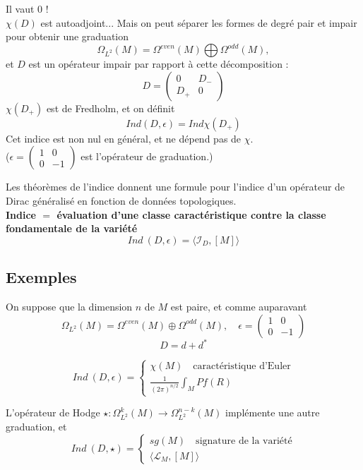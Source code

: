 \documentclass{beamer}
\begin{document}
\begin{frame}
Il vaut $0$ ! \\
$\chi(D)$ est autoadjoint... Mais on peut séparer les formes de degré pair et impair pour obtenir une graduation
\[\Omega_{L^2}(M) = \Omega^{even}(M) \bigoplus \Omega^{odd}(M),\]
et $D$ est un opérateur impair par rapport à cette décomposition :
\[D= \begin{pmatrix}0 & D_-\\ D_+ & 0  \end{pmatrix}\]
$\chi(D_+)$ est de Fredholm, et on définit
\[Ind(D,\epsilon)=Ind\chi(D_+)\]
Cet indice est non nul en général, et ne dépend pas de $\chi$.\\
($\epsilon = \begin{pmatrix}1 & 0 \\ 0 & -1\end{pmatrix}$ est l'opérateur de graduation.)
\end{frame}

\begin{frame}
Les théorèmes de l'indice donnent une formule pour l'indice d'un opérateur de Dirac généralisé en fonction de données topologiques.\\
\textbf{Indice $=$ évaluation d'une classe caractéristique contre la classe fondamentale de la variété }
\[Ind \ (D,\epsilon) = \langle \mathcal I _D , [M]\rangle\]
\end{frame}

\subsection{Exemples}
\begin{frame}%
On suppose que la dimension $n$ de $M$ est paire, et comme auparavant
\[\Omega_{L^2}(M)=\Omega^{even}(M)\oplus \Omega^{odd}(M),\quad \epsilon = \begin{pmatrix}1 & 0\\ 0 & -1 \end{pmatrix}\]
 \[D=d+d^*\]
\begin{thm}
\[Ind \ (D ,\epsilon) = \left\{\begin{array}{l} \chi(M)\quad \text{caractéristique d'Euler}\\ \frac{1}{(2\pi)^{n/2}}\int_M Pf(R)\end{array}\right.\]
\end{thm}
\end{frame}

\begin{frame}
L'opérateur de Hodge $\star : \Omega^{k}_{L^2}(M)\rightarrow \Omega_{L^2}^{n-k}(M)$ implémente une autre graduation, et 
\[Ind \ (D,\star) =\left\{ \begin{array}{l}sg(M)  \quad \text{signature de la variété}\\ \langle \mathcal L_M, [M]\rangle \end{array}\right.\]
\end{frame}
\end{document}
